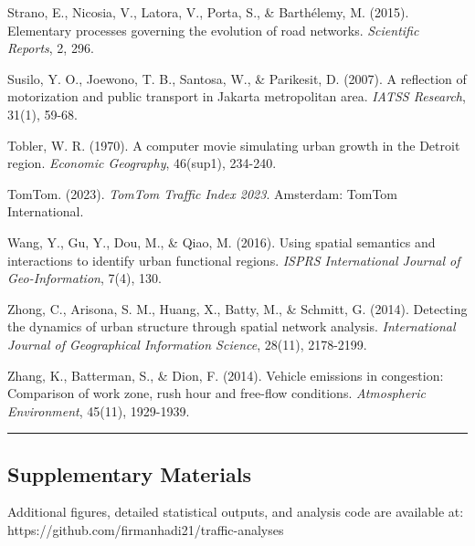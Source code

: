 \documentclass[
  12pt,
]{article}
\begin{document}
Strano, E., Nicosia, V., Latora, V., Porta, S., \& Barthélemy, M. (2015). Elementary processes governing the evolution of road networks. \emph{Scientific Reports}, 2, 296.

Susilo, Y. O., Joewono, T. B., Santosa, W., \& Parikesit, D. (2007). A reflection of motorization and public transport in Jakarta metropolitan area. \emph{IATSS Research}, 31(1), 59-68.

Tobler, W. R. (1970). A computer movie simulating urban growth in the Detroit region. \emph{Economic Geography}, 46(sup1), 234-240.

TomTom. (2023). \emph{TomTom Traffic Index 2023}. Amsterdam: TomTom International.

Wang, Y., Gu, Y., Dou, M., \& Qiao, M. (2016). Using spatial semantics and interactions to identify urban functional regions. \emph{ISPRS International Journal of Geo-Information}, 7(4), 130.

Zhong, C., Arisona, S. M., Huang, X., Batty, M., \& Schmitt, G. (2014). Detecting the dynamics of urban structure through spatial network analysis. \emph{International Journal of Geographical Information Science}, 28(11), 2178-2199.

Zhang, K., Batterman, S., \& Dion, F. (2014). Vehicle emissions in congestion: Comparison of work zone, rush hour and free-flow conditions. \emph{Atmospheric Environment}, 45(11), 1929-1939.

\begin{center}\rule{0.5\linewidth}{0.5pt}\end{center}

\subsection{Supplementary Materials}\label{supplementary-materials}

Additional figures, detailed statistical outputs, and analysis code are available at: https://github.com/firmanhadi21/traffic-analyses
\end{document}
